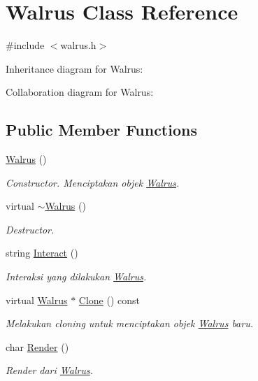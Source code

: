 \hypertarget{classWalrus}{}\section{Walrus Class Reference}
\label{classWalrus}


{\ttfamily \#include $<$walrus.\+h$>$}



Inheritance diagram for Walrus\+:


Collaboration diagram for Walrus\+:
\subsection*{Public Member Functions}
\begin{DoxyCompactItemize}
\item 
\hyperlink{classWalrus_a75c3d200b57a5c9fbcef9d8dc8247bf3}{Walrus} ()
\begin{DoxyCompactList}\small\item\em Constructor. Menciptakan objek \hyperlink{classWalrus}{Walrus}. \end{DoxyCompactList}\item 
virtual \hyperlink{classWalrus_a0dbf8812cdde2fecc53bee6823ff0119}{$\sim$\+Walrus} ()
\begin{DoxyCompactList}\small\item\em Destructor. \end{DoxyCompactList}\item 
string \hyperlink{classWalrus_aa21a90ecf8aff97c4cf90a59449ce02c}{Interact} ()
\begin{DoxyCompactList}\small\item\em Interaksi yang dilakukan \hyperlink{classWalrus}{Walrus}. \end{DoxyCompactList}\item 
virtual \hyperlink{classWalrus}{Walrus} $\ast$ \hyperlink{classWalrus_a9644eb3d51eb945b716bd37e25c7470e}{Clone} () const 
\begin{DoxyCompactList}\small\item\em Melakukan cloning untuk menciptakan objek \hyperlink{classWalrus}{Walrus} baru. \end{DoxyCompactList}\item 
char \hyperlink{classWalrus_a143f948e4c45e13a67f893caa435475d}{Render} ()
\begin{DoxyCompactList}\small\item\em Render dari \hyperlink{classWalrus}{Walrus}. \end{DoxyCompactList}\end{DoxyCompactItemize}

